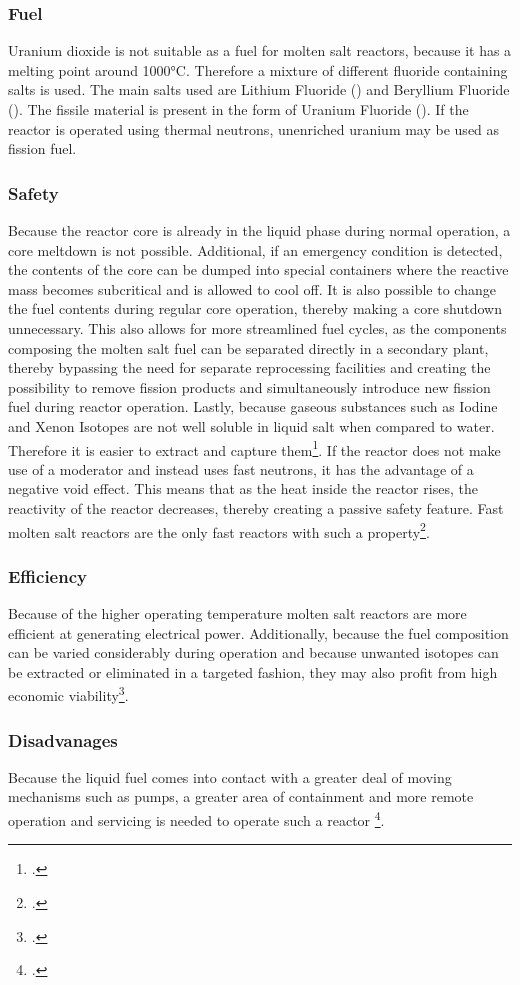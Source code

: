 \subsubsection{Fuel}
Uranium dioxide is not suitable as a fuel for molten salt reactors, because it has a melting point around
1000°C. Therefore a mixture of different fluoride containing salts is used. The main salts used are
Lithium Fluoride () and Beryllium Fluoride (). The fissile material is present in the
form of Uranium Fluoride (). If the reactor is operated using thermal neutrons, unenriched
uranium may be used as fission fuel.
\subsubsection{Safety}
Because the reactor core is already in the liquid phase during normal operation, a core meltdown is not
possible. Additional, if an emergency condition is detected, the contents of the core can be dumped
into special containers where the reactive mass becomes subcritical and is allowed to cool off.
It is also possible to change the fuel contents during regular core operation, thereby making a core
shutdown unnecessary. This also allows for more streamlined fuel cycles, as the components composing
the molten salt fuel can be separated directly in a secondary plant, thereby bypassing the need for
separate reprocessing facilities and creating the possibility to remove fission products and simultaneously
introduce new fission fuel during reactor operation. Lastly, because gaseous substances such as Iodine
and Xenon Isotopes are not well soluble in liquid salt when compared to water. Therefore
it is easier to extract and capture them\footcite{msrs}. If the reactor does not make use
of a moderator and instead uses fast neutrons, it has the advantage of a negative void effect. This
means that as the heat inside the reactor rises, the reactivity of the reactor decreases, thereby
creating a passive safety feature. Fast molten salt reactors are the only fast reactors with such a
property\footcite[164]{T4Gen}.
\subsubsection{Efficiency}
Because of the higher operating temperature molten salt reactors are more efficient at generating
electrical power. Additionally, because the fuel composition can be varied considerably during operation
and because unwanted isotopes can be extracted or eliminated in a targeted fashion, they may also
profit from high economic viability\footcite[159-161]{IVHandbook}.
\subsubsection{Disadvanages}
Because the liquid fuel comes into contact with a greater deal of moving mechanisms such as pumps, a
greater area of containment and more remote operation and servicing is needed to operate such a reactor
\footcite{msrs}.